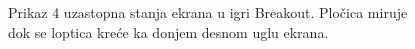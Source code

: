 \begin{figure}
	\caption{Prikaz 4 uzastopna stanja ekrana u igri Breakout. Pločica miruje dok se loptica kreće ka donjem desnom uglu ekrana.}
	\label{fig:ss}
\end{figure}

